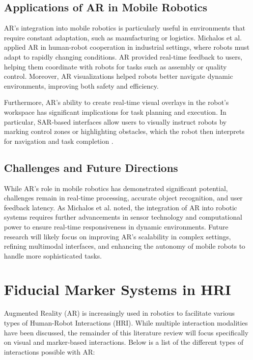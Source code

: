 \subsection{Applications of AR in Mobile Robotics}

AR’s integration into mobile robotics is particularly useful in environments that require constant adaptation, such as manufacturing or logistics. Michalos et al. \cite{Michalos2022} applied AR in human-robot cooperation in industrial settings, where robots must adapt to rapidly changing conditions. AR provided real-time feedback to users, helping them coordinate with robots for tasks such as assembly or quality control. Moreover, AR visualizations helped robots better navigate dynamic environments, improving both safety and efficiency.

Furthermore, AR’s ability to create real-time visual overlays in the robot’s workspace has significant implications for task planning and execution. In particular, SAR-based interfaces allow users to visually instruct robots by marking control zones or highlighting obstacles, which the robot then interprets for navigation and task completion \cite{Coovert2014}.

\subsection{Challenges and Future Directions}

While AR’s role in mobile robotics has demonstrated significant potential, challenges remain in real-time processing, accurate object recognition, and user feedback latency. As Michalos et al. \cite{Michalos2022} noted, the integration of AR into robotic systems requires further advancements in sensor technology and computational power to ensure real-time responsiveness in dynamic environments. Future research will likely focus on improving AR’s scalability in complex settings, refining multimodal interfaces, and enhancing the autonomy of mobile robots to handle more sophisticated tasks.



\section{Fiducial Marker Systems in HRI}

Augmented Reality (AR) is increasingly used in robotics to facilitate various types of Human-Robot Interactions (HRI). While multiple interaction modalities have been discussed, the remainder of this literature review will focus specifically on visual and marker-based interactions. Below is a list of the different types of interactions possible with AR:

